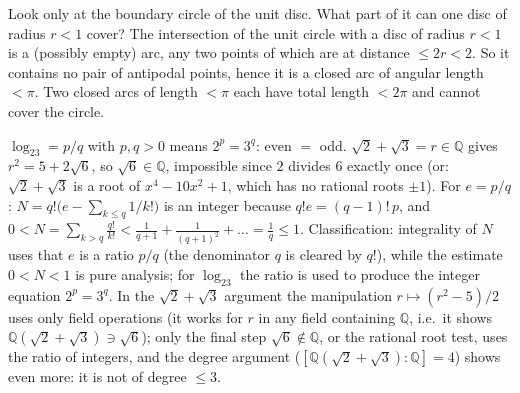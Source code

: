 \documentclass[11pt,a4paper]{article}
\begin{document}
 Look only at the boundary circle of the unit disc. What part of it can one disc of radius $r<1$ cover?
 The intersection of the unit circle with a disc of radius $r<1$ is a (possibly empty) arc, any two points of which are at distance $\le2r<2$. So it contains no pair of antipodal points, hence it is a closed arc of angular length $<\pi$.
 Two closed arcs of length $<\pi$ each have total length $<2\pi$ and cannot cover the circle.

 $\log_23=p/q$ with $p,q>0$ means $2^p=3^q$: even $=$ odd. $\sqrt2+\sqrt3=r\in\mathbb Q$ gives $r^2=5+2\sqrt6$, so $\sqrt6\in\mathbb Q$, impossible since $2$ divides $6$ exactly once (or: $\sqrt2+\sqrt3$ is a root of $x^4-10x^2+1$, which has no rational roots $\pm1$).
 For $e=p/q$: $N=q!\bigl(e-\sum_{k\le q}1/k!\bigr)$ is an integer because $q!e=(q-1)!\,p$, and $0<N=\sum_{k>q}\frac{q!}{k!}<\frac1{q+1}+\frac1{(q+1)^2}+\dots=\frac1q\le1$.
 Classification: integrality of $N$ uses that $e$ is a ratio $p/q$ (the denominator $q$ is cleared by $q!$), while the estimate $0<N<1$ is pure analysis; for $\log_23$ the ratio is used to produce the integer equation $2^p=3^q$. In the $\sqrt2+\sqrt3$ argument the manipulation $r\mapsto(r^2-5)/2$ uses only field operations (it works for $r$ in any field containing $\mathbb Q$, i.e.\ it shows $\mathbb Q(\sqrt2+\sqrt3)\ni\sqrt6$); only the final step $\sqrt6\notin\mathbb Q$, or the rational root test, uses the ratio of integers, and the degree argument ($[\mathbb Q(\sqrt2+\sqrt3):\mathbb Q]=4$) shows even more: it is not of degree $\le3$.
\end{document}
